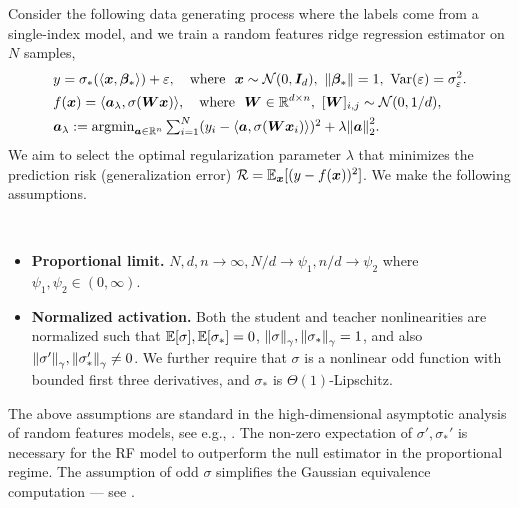 Consider the following data generating process where the labels come from a single-index model, and we train a random features ridge regression estimator on $N$ samples, 
\begin{align*}
    &y = \sigma_*(\langle{\boldsymbol x},{\boldsymbol \beta}_*\rangle) + \varepsilon, \quad \text{where~ } {\boldsymbol x}\sim\mathcal{N}(0,{\boldsymbol I}_d), ~ \norm{{\boldsymbol \beta}_*}=1, ~\mathrm{Var}(\varepsilon) = \sigma_\varepsilon^2. \\
    &f({\boldsymbol x}) = \langle{\boldsymbol a}_\lambda, \sigma({\boldsymbol W}{\boldsymbol x})\rangle, 
    \quad \text{where~ } {\boldsymbol W}\in\mathbb{R}^{d\times n}, ~
    [{\boldsymbol W}]_{i,j}\sim \mathcal{N}(0,1/d), \\
    &\textstyle{\boldsymbol a}_\lambda := \mathrm{argmin}_{{\boldsymbol a}\in\mathbb{R}^n} \sum_{i=1}^N (y_i - \langle{\boldsymbol a}, \sigma({\boldsymbol W}{\boldsymbol x}_i)\rangle)^2 + \lambda\norm{{\boldsymbol a}}_2^2. 
\end{align*}
We aim to select the optimal regularization parameter $\lambda$ that minimizes the prediction risk (generalization error) ${\mathcal R}=\mathbb{E}_{{\boldsymbol x}} [(y - f({\boldsymbol x}))^2]$. We make the following assumptions. 
\begin{assumption}\,
\begin{itemize}[leftmargin=*,topsep=0mm,itemsep=0mm]
    \item \textbf{Proportional limit.}  $N,d,n\to\infty, N/d\to\psi_1, n/d\to\psi_2$ where $\psi_1,\psi_2\in (0,\infty)$. 
    \item \textbf{Normalized activation.} Both the student and teacher nonlinearities are normalized such that $\mathbb{E}[\sigma],\mathbb{E}[\sigma_*]=0$, $\norm{\sigma}_\gamma,\norm{\sigma_*}_\gamma=1$, and also $\norm{\sigma'}_\gamma,\norm{\sigma_*'}_\gamma\neq 0$. We further require that $\sigma$ is a nonlinear odd function with bounded first three derivatives, and $\sigma_*$ is $\Theta(1)$-Lipschitz.
\end{itemize}
\label{assumption:RF}
\end{assumption}
\begin{remark}
The above assumptions are standard in the high-dimensional asymptotic analysis of random features models, see e.g., \cite{mei2022generalization,gerace2020generalisation}. The non-zero expectation of $\sigma',\sigma_*'$ is necessary for the RF model to outperform the null estimator in the proportional regime. The assumption of odd $\sigma$ simplifies the Gaussian equivalence computation --- see \cite{hu2022universality,ba2022high}. 
\end{remark}

